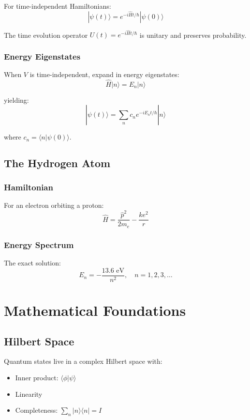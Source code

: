 \documentclass[12pt]{book}
\begin{document}
For time-independent Hamiltonians:
$$|\psi(t)\rangle = e^{-i\hat{H}t/\hbar}|\psi(0)\rangle$$

The time evolution operator $U(t) = e^{-i\hat{H}t/\hbar}$ is unitary and preserves probability.

\subsection{Energy Eigenstates}

When $V$ is time-independent, expand in energy eigenstates:
$$\hat{H}|n\rangle = E_n|n\rangle$$

yielding:
$$|\psi(t)\rangle = \sum_n c_n e^{-iE_n t/\hbar}|n\rangle$$

where $c_n = \langle n|\psi(0)\rangle$.

\section{The Hydrogen Atom}

\subsection{Hamiltonian}

For an electron orbiting a proton:
$$\hat{H} = \frac{\hat{p}^2}{2m_e} - \frac{ke^2}{r}$$

\subsection{Energy Spectrum}

The exact solution:
$$E_n = -\frac{13.6 \text{ eV}}{n^2}, \quad n = 1,2,3,\ldots$$

\chapter{Mathematical Foundations}

\section{Hilbert Space}

Quantum states live in a complex Hilbert space with:
\begin{itemize}
  \item Inner product: $\langle\phi|\psi\rangle$
  \item Linearity
  \item Completeness: $\sum_n |n\rangle\langle n| = I$
\end{itemize}
\end{document}
